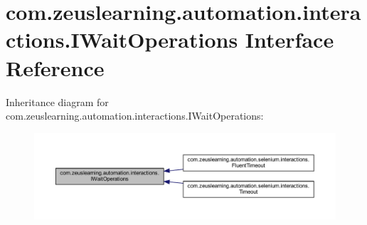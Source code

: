 \hypertarget{interfacecom_1_1zeuslearning_1_1automation_1_1interactions_1_1IWaitOperations}{}\section{com.\+zeuslearning.\+automation.\+interactions.\+I\+Wait\+Operations Interface Reference}
\label{interfacecom_1_1zeuslearning_1_1automation_1_1interactions_1_1IWaitOperations}


Inheritance diagram for com.\+zeuslearning.\+automation.\+interactions.\+I\+Wait\+Operations\+:
\nopagebreak
\begin{figure}[H]
\begin{center}
\leavevmode
\includegraphics[width=350pt]{d3/dd1/interfacecom_1_1zeuslearning_1_1automation_1_1interactions_1_1IWaitOperations__inherit__graph}
\end{center}
\end{figure}
